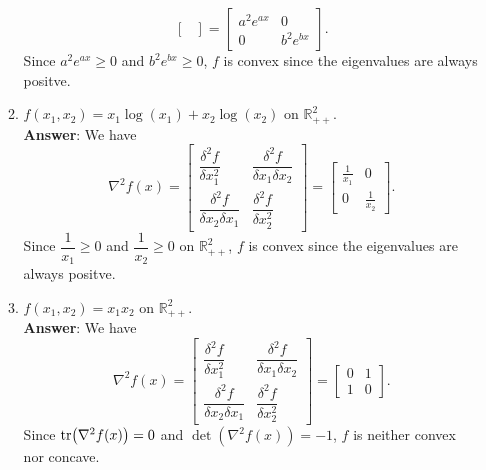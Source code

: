\documentclass{article}
\begin{document}
\begin{enumerate}
\begin{enumerate}
\[\begin{bmatrix}
                              \end{bmatrix}=\begin{bmatrix}
                                    a^2e^{ax} & 0         \\
                                    0         & b^2e^{bx}
                              \end{bmatrix}.
                        \] Since $a^2e^{ax}\geq 0$ and $b^2e^{bx}\geq 0$, $f$ is convex since the eigenvalues are always positve.
                  \item $f(x_1,x_2)=x_1\log(x_1)+x_2\log(x_2)$ on $\mathbb{R}_{++}^2$.\\
                        \textbf{Answer}: We have \[
                              \nabla^2 f(x)=\begin{bmatrix}
                                    \dfrac{\delta^2 f}{\delta x_1^2} & \dfrac{\delta^2 f}{\delta x_1\delta x_2} \\\dfrac{\delta^2 f}{\delta x_2\delta x_1}&\dfrac{\delta^2 f}{\delta x_2^2}
                              \end{bmatrix}=\begin{bmatrix}
                                    \frac{1}{x_1} & 0             \\
                                    0             & \frac{1}{x_2}
                              \end{bmatrix}.
                        \] Since $\dfrac{1}{x_1}\geq 0$ and $\dfrac{1}{x_2}\geq 0$ on $\mathbb{R}_{++}^2$, $f$ is convex since the eigenvalues are always positve.
                  \item $f(x_1,x_2)=x_1x_2$ on $\mathbb{R}_{++}^2$.\\
                        \textbf{Answer}: We have \[
                              \nabla^2 f(x)=\begin{bmatrix}
                                    \dfrac{\delta^2 f}{\delta x_1^2} & \dfrac{\delta^2 f}{\delta x_1\delta x_2} \\\dfrac{\delta^2 f}{\delta x_2\delta x_1}&\dfrac{\delta^2 f}{\delta x_2^2}
                              \end{bmatrix}=\begin{bmatrix}
                                    0 & 1 \\
                                    1 & 0
                              \end{bmatrix}.
                        \] Since $\tr(\nabla^2 f(x))=0$ and $\det(\nabla^2 f(x))=-1$, $f$ is neither convex nor concave.

\end{enumerate}
\end{enumerate}
\end{document}
